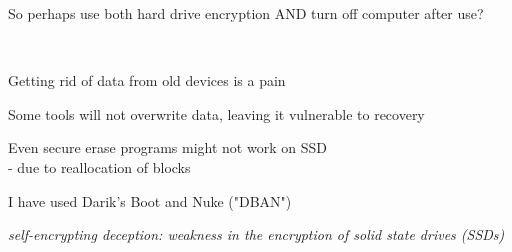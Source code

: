 \documentclass[Screen16to9,17pt]{foils}
\begin{document}
\centerline{So perhaps use both hard drive encryption AND turn off computer after use?}


{~}

\begin{list1}
\item Getting rid of data from old devices is a pain
\item Some tools will not overwrite data, leaving it vulnerable to recovery
\item Even secure erase programs might not work on SSD\\
 - due to reallocation of blocks
\item I have used Darik's Boot and Nuke ("DBAN")\\
\end{list1}



\emph{self-encrypting deception: weakness in the encryption of solid state drives (SSDs)}\\







\slidenext
\end{document}
